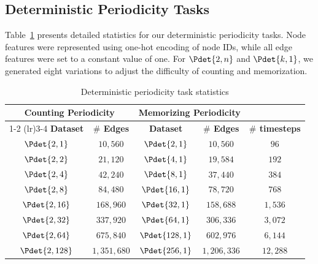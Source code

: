 \subsection{Deterministic Periodicity Tasks}\label{appendix:periodicity-deterministic-stats}
Table~\ref{tab:det_periodic_datasets} presents detailed statistics for our deterministic periodicity tasks. Node features were represented using one-hot encoding of node IDs, while all edge features were set to a constant value of one. For $\Pdet{2, n}$ and $\Pdet{k, 1}$, we generated eight variations to adjust the difficulty of counting and memorization.
\begin{table}[h]
\caption{Deterministic periodicity task statistics}
\centering
\begin{tabular}{cc | cc | c}
\toprule
\multicolumn{2}{c}{Counting Periodicity} & \multicolumn{2}{c}{Memorizing Periodicity} & \\
\cmidrule(lr){1-2} \cmidrule(lr){3-4}
\textbf{Dataset} & \textbf{$\#$ Edges } & \textbf{Dataset} & \textbf{$\#$ Edges } & \textbf{$\#$ timesteps}  \\
\midrule
$\Pdet{2, 1}$ & $10,560$ & $\Pdet{2, 1}$ & $10,560$ & $96$  \\[0.24em]
$\Pdet{2, 2}$ & $21,120$ & $\Pdet{4, 1}$ & $19,584$ & $192$ \\[0.24em]
$\Pdet{2, 4}$ & $42,240$ & $\Pdet{8, 1}$ & $37,440$ & $384$ \\[0.24em]
$\Pdet{2, 8}$ & $84,480$ & $\Pdet{16, 1}$ & $78,720$ & $768$ \\[0.24em]
$\Pdet{2, 16}$ & $168,960$ & $\Pdet{32, 1}$ & $158,688$ & $1,536$ \\[0.24em]
$\Pdet{2, 32}$ & $337,920$ & $\Pdet{64, 1}$ & $306,336$ & $3,072$ \\[0.24em]
$\Pdet{2, 64}$ & $675,840$ & $\Pdet{128, 1}$ & $602,976$ & $6,144$ \\[0.24em]
$\Pdet{2, 128}$ & $1,351,680$ & $\Pdet{256, 1}$ & $1,206,336$ & $12,288$ \\[0.24em]
\bottomrule
\end{tabular}
\vspace{1em}
\label{tab:det_periodic_datasets}
\end{table}

